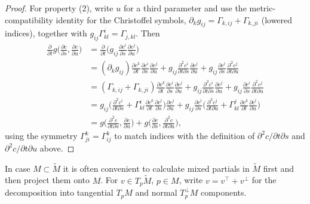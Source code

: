 \begin{proof}
  For property (2), write $u$ for a third parameter and use the metric-compatibility
  identity for the Christoffel symbols, $\partial_kg_{ij}=\Gamma_{k,ij}+\Gamma_{k,ji}$
  (lowered indices), together with $g_{ij}\Gamma^i_{kl}=\Gamma_{j,kl}$. Then
  \begin{align*}
    \frac{\partial}{\partial t}g\Big(\frac{\partial c}{\partial s},\frac{\partial c}{\partial u}\Big)
    &=\frac{\partial}{\partial t}\Big(g_{ij}\frac{\partial c^i}{\partial s}\frac{\partial c^j}{\partial u}\Big)\\
    &=(\partial_kg_{ij})\frac{\partial c^k}{\partial t}\frac{\partial c^i}{\partial s}\frac{\partial c^j}{\partial u}
    +g_{ij}\frac{\partial^2c^i}{\partial t\partial s}\frac{\partial c^j}{\partial u}
    +g_{ij}\frac{\partial c^i}{\partial s}\frac{\partial^2c^j}{\partial t\partial u}\\
    &=(\Gamma_{k,ij}+\Gamma_{k,ji})\frac{\partial c^k}{\partial t}\frac{\partial c^i}{\partial s}\frac{\partial c^j}{\partial u}
    +g_{ij}\frac{\partial^2c^i}{\partial t\partial s}\frac{\partial c^j}{\partial u}
    +g_{ij}\frac{\partial c^i}{\partial s}\frac{\partial^2c^j}{\partial t\partial u}\\
    &=g_{ij}\Big(\frac{\partial^2c^i}{\partial t\partial s}+\Gamma^i_{kl}\frac{\partial c^k}{\partial t}\frac{\partial c^l}{\partial s}\Big)\frac{\partial c^j}{\partial u}
    +g_{ij}\frac{\partial c^i}{\partial s}\Big(\frac{\partial^2c^j}{\partial t\partial u}+\Gamma^j_{kl}\frac{\partial c^k}{\partial t}\frac{\partial c^l}{\partial u}\Big)\\
    &=g\Big(\frac{\partial^2c}{\partial t\partial s},\frac{\partial c}{\partial u}\Big)
    +g\Big(\frac{\partial c}{\partial s},\frac{\partial^2c}{\partial t\partial u}\Big),
  \end{align*}
  using the symmetry $\Gamma^k_{ji}=\Gamma^k_{ij}$ to match indices with the
  definition of $\partial^2c/\partial t\partial s$ and $\partial^2c/\partial t\partial u$
  above.
\end{proof}

In case $M\subset\tilde M$ it is often convenient to calculate mixed partials in
$\tilde M$ first and then project them onto $M$. For $v\in T_p\tilde M$, $p\in M$,
write $v=v^\top+v^\perp$ for the decomposition into tangential $T_pM$ and normal
$T_p^\perp M$ components.

